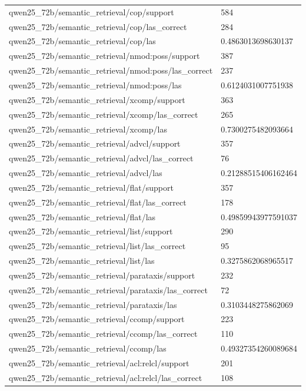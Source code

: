 \begin{tabular}{ll}
qwen25\_72b/semantic\_retrieval/cop/support & 584 \\
qwen25\_72b/semantic\_retrieval/cop/las\_correct & 284 \\
qwen25\_72b/semantic\_retrieval/cop/las & 0.4863013698630137 \\
qwen25\_72b/semantic\_retrieval/nmod:poss/support & 387 \\
qwen25\_72b/semantic\_retrieval/nmod:poss/las\_correct & 237 \\
qwen25\_72b/semantic\_retrieval/nmod:poss/las & 0.6124031007751938 \\
qwen25\_72b/semantic\_retrieval/xcomp/support & 363 \\
qwen25\_72b/semantic\_retrieval/xcomp/las\_correct & 265 \\
qwen25\_72b/semantic\_retrieval/xcomp/las & 0.7300275482093664 \\
qwen25\_72b/semantic\_retrieval/advcl/support & 357 \\
qwen25\_72b/semantic\_retrieval/advcl/las\_correct & 76 \\
qwen25\_72b/semantic\_retrieval/advcl/las & 0.21288515406162464 \\
qwen25\_72b/semantic\_retrieval/flat/support & 357 \\
qwen25\_72b/semantic\_retrieval/flat/las\_correct & 178 \\
qwen25\_72b/semantic\_retrieval/flat/las & 0.49859943977591037 \\
qwen25\_72b/semantic\_retrieval/list/support & 290 \\
qwen25\_72b/semantic\_retrieval/list/las\_correct & 95 \\
qwen25\_72b/semantic\_retrieval/list/las & 0.3275862068965517 \\
qwen25\_72b/semantic\_retrieval/parataxis/support & 232 \\
qwen25\_72b/semantic\_retrieval/parataxis/las\_correct & 72 \\
qwen25\_72b/semantic\_retrieval/parataxis/las & 0.3103448275862069 \\
qwen25\_72b/semantic\_retrieval/ccomp/support & 223 \\
qwen25\_72b/semantic\_retrieval/ccomp/las\_correct & 110 \\
qwen25\_72b/semantic\_retrieval/ccomp/las & 0.49327354260089684 \\
qwen25\_72b/semantic\_retrieval/acl:relcl/support & 201 \\
qwen25\_72b/semantic\_retrieval/acl:relcl/las\_correct & 108 \\

\end{tabular}
